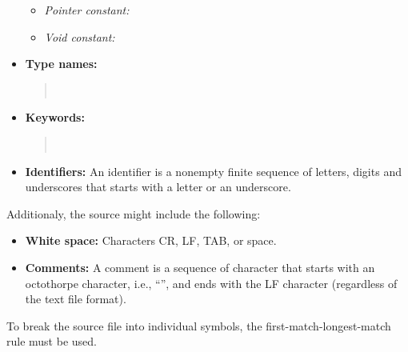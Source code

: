 \documentclass[10pt]{article}
\begin{document}
\begin{itemize}
\begin{itemize}
\item \textit{Pointer constant:} 
\item \textit{Void constant:} 
\end{itemize}
\item \textbf{Type names:}
\begin{quote}
\ \ \ \ \ \ \ \ 
\end{quote}
\item \textbf{Keywords:}
\begin{quote}
\ \ \ \ \ \ \ \ \ \ \ \ \ \ \ \ \ \ \ \ \ \ \ \ 
\end{quote}
\item \textbf{Identifiers:} An identifier is a nonempty finite sequence of letters, digits and underscores that starts with a letter or an underscore.
\end{itemize}
Additionaly, the source might include the following:
\begin{itemize}
\item \textbf{White space:} Characters CR, LF, TAB, or space.
\item \textbf{Comments:} A comment is a sequence of character that starts with an octothorpe character, i.e., ``\texttt{}'', and ends with the LF character (regardless of the text file format).
\end{itemize}

To break the source file into individual symbols, the first-match-longest-match rule must be used.
\end{document}
